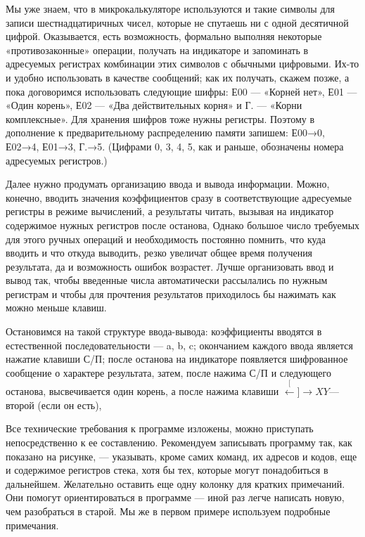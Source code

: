 \documentclass[11pt,a4paper,oneside]{article}
\def\XY{$\stackrel[\leftarrow]{\rightarrow}{XY}$}
\begin{document}
Мы уже знаем, что в микрокалькуляторе используются и такие символы для записи шестнадцатиричных чисел, которые не спутаешь ни с одной десятичной цифрой. Оказывается, есть возможность, формально выполняя некоторые «противозаконные» операции, получать на индикаторе и запоминать в адресуемых регистрах комбинации этих символов с обычными цифровыми. Их-то и удобно использовать в качестве сообщений; как их получать, скажем позже, а пока договоримся использовать следующие шифры: Е00	— «Корней нет», Е01 — «Один корень», Е02 — «Два действительных корня» и Г. — «Корни комплексные». Для хранения шифров тоже нужны регистры. Поэтому в дополнение к предварительному распределению памяти запишем: Е00→0, Е02→4, Е01→3, Г.→5. (Цифрами 0, 3, 4, 5, как и раньше, обозначены номера адресуемых регистров.)

Далее нужно продумать организацию ввода и вывода информации. Можно, конечно, вводить значения коэффициентов сразу в соответствующие адресуемые регистры в режиме вычислений, а результаты читать, вызывая на индикатор содержимое нужных регистров после останова, Однако большое число требуемых для этого ручных операций и необходимость постоянно помнить, что куда вводить и что откуда выводить, резко увеличат общее время получения результата, да и возможность ошибок возрастет. Лучше организовать ввод и вывод так, чтобы введенные числа автоматически рассылались по нужным регистрам и чтобы для прочтения результатов приходилось бы нажимать как можно меньше клавиш.

Остановимся на такой структуре ввода-вывода: коэффициенты вводятся в естественной последовательности — a, b, c; окончанием каждого ввода является нажатие клавиши С/П; после останова на индикаторе появляется шифрованное сообщение о характере результата, затем, после нажима С/П и следующего останова, высвечивается один корень, а после нажима клавиши \XY — второй (если он есть),

Все технические требования к программе изложены, можно приступать непосредственно к ее составлению. Рекомендуем записывать программу так, как показано на рисунке, — указывать, кроме самих команд, их адресов и кодов, еще и содержимое регистров стека, хотя бы тех, которые могут понадобиться в дальнейшем. Желательно оставить еще одну колонку для кратких примечаний. Они помогут ориентироваться в программе — иной раз легче написать новую, чем разобраться в старой. Мы же в первом примере используем подробные примечания.
\end{document}
